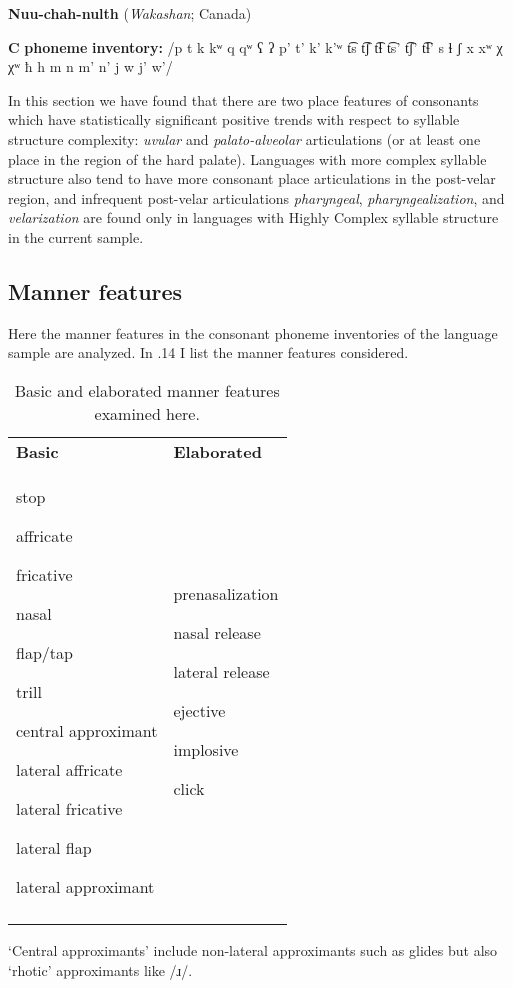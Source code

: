 \ea\label{ex:(4.33)}
  \textbf{Nuu-chah-nulth} (\textit{Wakashan}; Canada)

\textbf{C} \textbf{phoneme} \textbf{inventory:} /p t k kʷ q qʷ ʕ ʔ p’ t’ k’ k’ʷ t͡s t͡ʃ t͡ɬ t͡s’ t͡ʃ’ t͡ɬ’ s ɬ ʃ x xʷ χ χʷ ħ h m n m’ n’ j w j’ w’/

\z

  In this section we have found that there are two place features of consonants which have statistically significant positive trends with respect to syllable structure complexity: \textit{uvular} and \textit{palato-alveolar} articulations (or at least one place in the region of the hard palate). Languages with more complex syllable structure also tend to have more consonant place articulations in the post-velar region, and infrequent post-velar articulations \textit{pharyngeal}, \textit{pharyngealization}, and \textit{velarization} are found only in languages with Highly Complex syllable structure in the current sample.

\subsection{Manner features}\label{sec:4.4.5}

  Here the manner features in the consonant phoneme inventories of the language sample are analyzed. In .14 I list the manner features considered.

\begin{table}
\begin{tabularx}{\textwidth}{XX}
\lsptoprule

\textbf{Basic} & \textbf{Elaborated}\\
stop

affricate

fricative

nasal

flap/tap

trill

central approximant

lateral affricate

lateral fricative

lateral flap

lateral approximant & prenasalization

nasal release

lateral release

ejective

implosive

click\\
\lspbottomrule
\end{tabularx}
\caption{\label{4.14}Basic and elaborated manner features examined here.}‘Central approximants’ include non-lateral approximants such as glides but also ‘rhotic’ approximants like /ɹ/.
\end{table}

